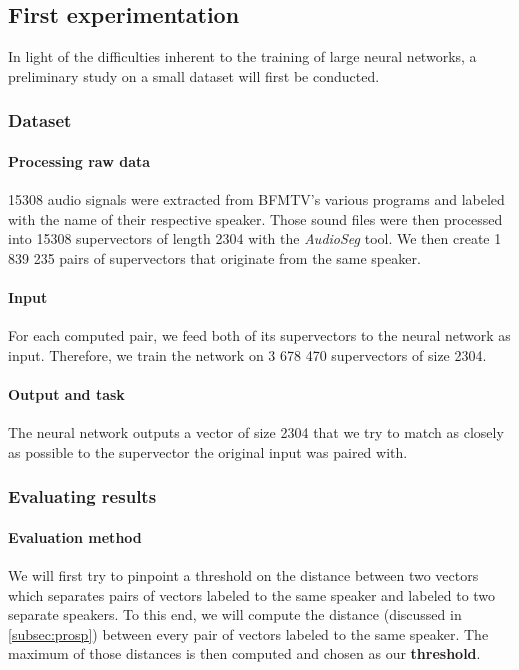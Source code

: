 \documentclass[conference]{IEEEtran}
\begin{document}
\subsection{First experimentation}

In light of the difficulties inherent to the training of large neural networks,
a preliminary study on a small dataset will first be conducted.

\subsubsection{Dataset}

\paragraph{Processing raw data}

15308 audio signals were extracted from BFMTV's various programs and labeled
with the name of their respective speaker. Those sound files were then processed
into 15308 supervectors of length 2304 with the \emph{AudioSeg} tool.
We then create 1 839 235 pairs of supervectors that originate from the same
speaker.

\paragraph{Input}

For each computed pair, we feed both of its supervectors to the neural network as
input. Therefore, we train the network on 3 678 470 supervectors of size 2304.

\paragraph{Output and task}

The neural network outputs a vector of size 2304 that we try to match as closely
as possible to the supervector the original input was paired with.

\subsubsection{Evaluating results}

\paragraph{Evaluation method}

We will first try to pinpoint a threshold on the distance
between two vectors which separates pairs of vectors labeled to the same speaker
and labeled to two separate speakers. To this end, we will compute the distance
(discussed in \ref{subsec:prosp}) between every pair of vectors labeled to the
same speaker. The maximum of those distances is then computed and chosen as our
\textbf{threshold}.
\end{document}
